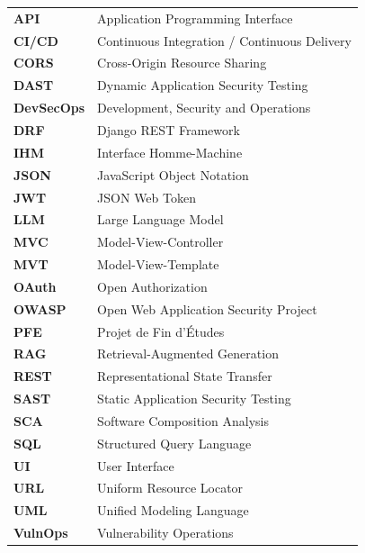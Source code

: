 \documentclass[12pt, a4paper, oneside]{report}
\begin{document}
\begin{tabular}{ll}
    \textbf{API}        & Application Programming Interface \\
    \textbf{CI/CD}      & Continuous Integration / Continuous Delivery \\
    \textbf{CORS}       & Cross-Origin Resource Sharing \\
    \textbf{DAST}       & Dynamic Application Security Testing \\
    \textbf{DevSecOps}  & Development, Security and Operations \\
    \textbf{DRF}        & Django REST Framework \\
    \textbf{IHM}        & Interface Homme-Machine \\
    \textbf{JSON}       & JavaScript Object Notation \\
    \textbf{JWT}        & JSON Web Token \\
    \textbf{LLM}        & Large Language Model \\
    \textbf{MVC}        & Model-View-Controller \\
    \textbf{MVT}        & Model-View-Template \\
    \textbf{OAuth}      & Open Authorization \\
    \textbf{OWASP}      & Open Web Application Security Project \\
    \textbf{PFE}        & Projet de Fin d'Études \\
    \textbf{RAG}        & Retrieval-Augmented Generation \\
    \textbf{REST}       & Representational State Transfer \\
    \textbf{SAST}       & Static Application Security Testing \\
    \textbf{SCA}        & Software Composition Analysis \\
    \textbf{SQL}        & Structured Query Language \\
    \textbf{UI}         & User Interface \\
    \textbf{URL}        & Uniform Resource Locator \\
    \textbf{UML}        & Unified Modeling Language \\
    \textbf{VulnOps}    & Vulnerability Operations \\
\end{tabular}
\newpage

\pagestyle{fancy}
\setcounter{page}{1}
\end{document}
